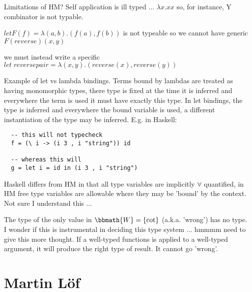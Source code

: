 Limitations of HM? Self application is ill typed ... $\lambda
x . x x$ so, for instance, Y combinator is not typable.

$let F(f) = \lambda (a,b) . (f(a), f(b))$ is not typeable so we cannot
have generic $F(reverse)(x,y)$

we must instead write a specific $let\; reversepair = \lambda (x,y)
. (reverse(x), reverse(y))$

Example of let vs lambda bindings. Terms bound by lambdas are treated
as having monomorphic types, there type is fixed at the time it is
inferred and everywhere the term is used it must have exactly this
type. In let bindings, the type is inferred and everywhere the bound
variable is used, a different instantiation of the type may be
inferred.
E.g. in Haskell:

\begin{verbatim}
  -- this will not typecheck
  f = (\ i -> (i 3 , i "string")) id
  
  -- whereas this will
  g = let i = id in (i 3 , i "string")
\end{verbatim}

Haskell differs from HM in that all type variables are implicitly
$\forall$ quantified, in HM free type variables are allowable where
they may be 'bound' by the context. Not sure I understand this ...

The type of the only value in $\bbmath{W}=\{\cot\}$ (a.k.a. 'wrong')
has no type. I wonder if this is instrumental in deciding this type
system ... hmmmm need to give this more thought. If a well-typed
functions is applied to a well-typed argument, it will produce the
right type of result. It cannot go 'wrong'.

\section{Martin L\"{o}f}
